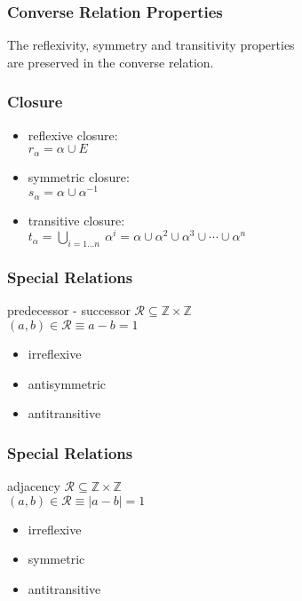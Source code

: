 \documentclass[dvipsnames]{beamer}
\begin{document}
\begin{frame}
  \frametitle{Converse Relation Properties}

  \begin{theorem}
    The reflexivity, symmetry and transitivity properties\\
    are preserved in the converse relation.
  \end{theorem}
\end{frame}

\begin{frame}
  \frametitle{Closure}

  \begin{itemize}
    \item reflexive closure:\\
      $r_{\alpha} = \alpha \cup E$

    \pause
    \medskip
    \item symmetric closure:\\
      $s_{\alpha} = \alpha \cup \alpha^{-1}$

    \pause
    \medskip
    \item transitive closure:\\
      $t_{\alpha} = \bigcup_{i=1 \dots n}~\alpha^i
        = \alpha \cup \alpha^2 \cup \alpha^3 \cup \cdots \cup \alpha^n$
  \end{itemize}
\end{frame}

\begin{frame}
  \frametitle{Special Relations}

  \begin{block}{predecessor - successor}
    $\mathcal{R} \subseteq \mathbb{Z} \times \mathbb{Z}$\\
    $(a,b) \in \mathcal{R} \equiv a-b=1$

    \medskip
    \begin{itemize}
      \item irreflexive
      \item antisymmetric
      \item antitransitive
    \end{itemize}
  \end{block}
\end{frame}

\begin{frame}
  \frametitle{Special Relations}

  \begin{block}{adjacency}
    $\mathcal{R} \subseteq \mathbb{Z} \times \mathbb{Z}$\\
    $(a,b) \in \mathcal{R} \equiv |a-b|=1$

    \medskip
    \begin{itemize}
      \item irreflexive
      \item symmetric
      \item antitransitive
    \end{itemize}
  \end{block}
\end{frame}
\end{document}
